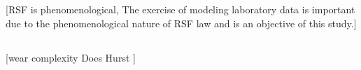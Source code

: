 \documentclass[final,3p, 11pt,authoryear]{elsarticle}
\begin{document}
\subsection{}
[RSF is phenomenological,
The exercise of modeling laboratory data is important due to the phenomenological nature of RSF law and is an objective of this study.]

\subsection{}
[wear complexity
Does Hurst ]

\end{document}
